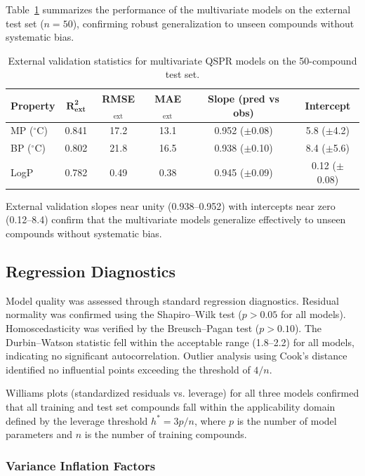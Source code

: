 \documentclass[12pt,a4paper]{article}
\begin{document}
Table~\ref{tab:external_validation} summarizes the performance of the multivariate models on the external test set ($n = 50$), confirming robust generalization to unseen compounds without systematic bias.

\begin{table}[H]
\centering
\caption{External validation statistics for multivariate QSPR models on the 50-compound test set.}
\label{tab:external_validation}
\begin{tabular}{@{}lccccc@{}}
\toprule
\textbf{Property} & $\mathbf{R^2_{\text{ext}}}$ & \textbf{RMSE$_{\text{ext}}$} & \textbf{MAE$_{\text{ext}}$} & \textbf{Slope (pred vs obs)} & \textbf{Intercept} \\
\midrule
MP ($^{\circ}$C) & 0.841 & 17.2 & 13.1 & 0.952 ($\pm$0.08) & 5.8 ($\pm$4.2) \\
BP ($^{\circ}$C) & 0.802 & 21.8 & 16.5 & 0.938 ($\pm$0.10) & 8.4 ($\pm$5.6) \\
LogP & 0.782 & 0.49 & 0.38 & 0.945 ($\pm$0.09) & 0.12 ($\pm$0.08) \\
\bottomrule
\end{tabular}
\end{table}

\noindent External validation slopes near unity (0.938--0.952) with intercepts near zero (0.12--8.4) confirm that the multivariate models generalize effectively to unseen compounds without systematic bias.

\subsection{Regression Diagnostics}

Model quality was assessed through standard regression diagnostics\cite{tropsha2010best}. Residual normality was confirmed using the Shapiro--Wilk test ($p > 0.05$ for all models). Homoscedasticity was verified by the Breusch--Pagan test ($p > 0.10$). The Durbin--Watson statistic fell within the acceptable range (1.8--2.2) for all models, indicating no significant autocorrelation. Outlier analysis using Cook's distance identified no influential points exceeding the threshold of $4/n$.

Williams plots (standardized residuals vs. leverage) for all three models confirmed that all training and test set compounds fall within the applicability domain defined by the leverage threshold $h^* = 3p/n$, where $p$ is the number of model parameters and $n$ is the number of training compounds.

\subsubsection{Variance Inflation Factors}
\end{document}
